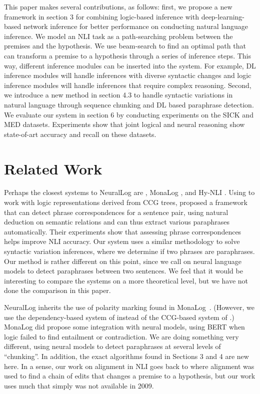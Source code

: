 \documentclass[11pt,a4paper]{article}
\begin{document}
This paper makes several contributions, as follows: first, we propose a new framework in section 3 for combining logic-based inference with deep-learning-based network inference for better performance on conducting natural language inference. We model an NLI task as a path-searching problem between the premises and the hypothesis. We use beam-search to find an optimal path that can transform a premise to a hypothesis through a series of inference steps. This way, different inference modules can be inserted into the system. For example, DL inference modules will handle inferences with diverse syntactic changes and logic inference modules will handle inferences that require complex reasoning. Second, we introduce a new method in section 4.3 to handle syntactic variations in natural language through sequence chunking and DL based paraphrase detection. We evaluate our system in section 6 by conducting experiments on the SICK and MED datasets. Experiments show that joint logical and neural reasoning show state-of-art accuracy and recall on these datasets.

\section{Related Work}
Perhaps the closest systems to NeuralLog are
\citet{yanaka-etal-2018-acquisition}, MonaLog \cite{hu-etal-2020-monalog}, and Hy-NLI \cite{kalouli-etal-2020-hy}. Using \citet{ccg2lambda} to work with logic representations derived from CCG trees, \citet{yanaka-etal-2018-acquisition} proposed a framework that can detect phrase correspondences for a sentence pair, using
natural deduction on semantic relations and can thus extract various paraphrases automatically. Their experiments show that assessing phrase correspondences helps improve NLI accuracy. Our system uses a similar methodology to solve syntactic variation inferences, where we determine if two phrases are paraphrases. Our method is rather different on this point, since we call on neural language models to detect paraphrases between two sentences. We feel that it would be interesting to compare the systems on a more theoretical level, but we have not done the comparison in this paper.

NeuralLog inherits the use of polarity marking found in MonaLog~\cite{hu-etal-2020-monalog}.
(However, we use the dependency-based system of \citet{chengaoudep2mono} instead of the CCG-based system of \citet{hu-moss-2018-polarity}.) MonaLog did propose some integration with neural models, using BERT when logic failed to find entailment or contradiction. We are doing something very different, using neural models to detect paraphrases at several levels of ``chunking''. In addition, the exact algorithms found in Sections 3 and 4 are new here. In a sense, our work on alignment in NLI goes back to \citet{MacCartneyManning} where alignment was used to find a chain of edits that changes a premise to a hypothesis, but our work uses much that simply was not available in 2009.
\end{document}
